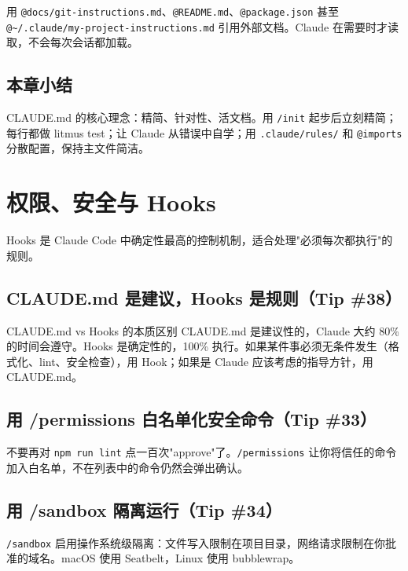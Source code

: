\documentclass[a4paper]{article}
\begin{document}
用 \texttt{@docs/git-instructions.md}、\texttt{@README.md}、\texttt{@package.json} 甚至 \texttt{@\textasciitilde/.claude/my-project-instructions.md} 引用外部文档。Claude 在需要时才读取，不会每次会话都加载。

\subsection{本章小结}

CLAUDE.md 的核心理念：精简、针对性、活文档。用 \texttt{/init} 起步后立刻精简；每行都做 litmus test；让 Claude 从错误中自学；用 \texttt{.claude/rules/} 和 \texttt{@imports} 分散配置，保持主文件简洁。

\section{权限、安全与 Hooks}

Hooks 是 Claude Code 中确定性最高的控制机制，适合处理"必须每次都执行"的规则。

\subsection{CLAUDE.md 是建议，Hooks 是规则（Tip \#38）}

\begin{importantbox}{CLAUDE.md vs Hooks 的本质区别}
CLAUDE.md 是建议性的，Claude 大约 80\% 的时间会遵守。Hooks 是确定性的，100\% 执行。如果某件事必须无条件发生（格式化、lint、安全检查），用 Hook；如果是 Claude 应该考虑的指导方针，用 CLAUDE.md。
\end{importantbox}

\subsection{用 /permissions 白名单化安全命令（Tip \#33）}

不要再对 \texttt{npm run lint} 点一百次"approve"了。\texttt{/permissions} 让你将信任的命令加入白名单，不在列表中的命令仍然会弹出确认。

\subsection{用 /sandbox 隔离运行（Tip \#34）}

\texttt{/sandbox} 启用操作系统级隔离：文件写入限制在项目目录，网络请求限制在你批准的域名。macOS 使用 Seatbelt，Linux 使用 bubblewrap。
\end{document}
